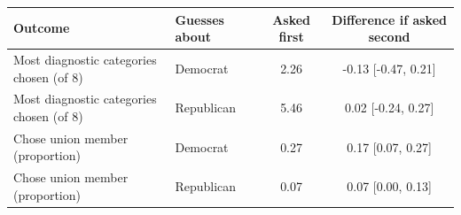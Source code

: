 \begin{tabular}{llcc}
\toprule
Outcome & Guesses about & Asked first & Difference if asked second \\
\midrule
Most diagnostic categories chosen (of 8) & Democrat & 2.26 & -0.13 [-0.47, 0.21] \\
Most diagnostic categories chosen (of 8) & Republican & 5.46 & 0.02 [-0.24, 0.27] \\
Chose union member (proportion) & Democrat & 0.27 & 0.17 [0.07, 0.27] \\
Chose union member (proportion) & Republican & 0.07 & 0.07 [0.00, 0.13] \\
\bottomrule
\end{tabular}
